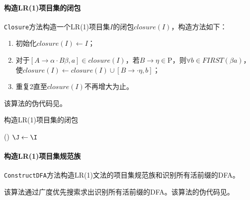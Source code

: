 \documentclass[lang=cn,11pt,a4paper,cite=authornum]{paper}
\begin{document}
\paragraph{构造LR(1)项目集的闭包} \texttt{Closure}方法构造一个LR(1)项目集$I$的闭包$closure(I)$，构造方法如下：

\begin{enumerate}
    \item 初始化$closure(I)\leftarrow I$；
    \item 对于$[A\rightarrow \alpha\cdot B\beta, a]\in closure(I)$，若$B\rightarrow\eta\in \mathrm P$，则$\forall b\in FIRST(\beta a)$，使$closure(I)\leftarrow closure(I)\cup [B\rightarrow \cdot \eta,b]$；
    \item 重复2直至$closure(I)$不再增大为止。
\end{enumerate}

该算法的伪代码见。

\begin{algorithm}[!htb]
    \caption{构造LR(1)项目集的闭包\label{algo:closure}}
    \Fn(){\Closure{\I}}{
        $\J\leftarrow\I$\;
    }
\end{algorithm}

\paragraph{构造LR(1)项目集规范族} \texttt{ConstructDFA}方法构造LR(1)文法的项目集规范族和识别所有活前缀的DFA。

该算法通过广度优先搜索求出识别所有活前缀的DFA。该算法的伪代码见。
\end{document}
